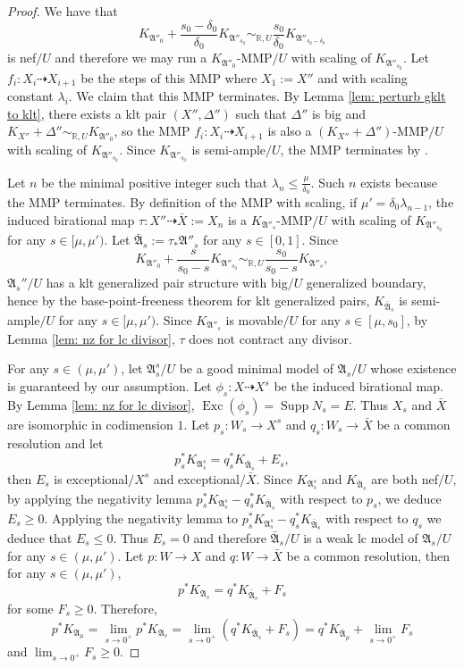 \documentclass[12pt]{amsart}
\numberwithin{equation}{section}
\newcommand{\Exc}{\operatorname{Exc}}
\newcommand{\Supp}{\operatorname{Supp}}
\newcommand{\Aa}{{\mathfrak{A}}}
\theoremstyle{definition}
\theoremstyle{definition}
\theoremstyle{definition}
\begin{document}
\begin{proof}
We have that $$K_{\Aa''_0}+\frac{s_0-\delta_0}{\delta_0}K_{\Aa''_{s_0}}\sim_{\mathbb R,U}\frac{s_0}{\delta_0}K_{\Aa''_{s_0-\delta_0}}$$
is nef$/U$ and therefore we may
run a
$K_{\Aa''_0}$-MMP$/U$ with scaling of $K_{\Aa''_{s_0}}$. 
  Let $f_i: X_i\dashrightarrow X_{i+1}$ be the steps of this MMP where $X_1:=X''$ and with scaling constant $\lambda_i$. We claim that this MMP terminates. By Lemma \ref{lem: perturb gklt to klt}, there exists a klt pair $(X'',\Delta'')$ such that $\Delta''$ is big and $K_{X''}+\Delta''\sim_{\mathbb R,U}K_{\Aa''_0}$, so the MMP $f_i: X_i\dashrightarrow X_{i+1}$ is also a $(K_{X''}+\Delta'')$-MMP$/U$ with scaling of $K_{\Aa''_{s_0}}$. Since $K_{\Aa''_{s_0}}$ is semi-ample$/U$, the MMP terminates by \cite[Corollary 1.4.2]{BCHM10}.

Let $n$ be the minimal positive integer such that $\lambda_n\leq \frac{\mu}{\delta_0}$. Such $n$ exists because the MMP terminates. By definition of the MMP with scaling, if $\mu' = \delta_0\lambda_{n-1}$, the induced birational map $\tau: X''\dashrightarrow \bar X:=X_n$ is a $K_{\Aa''_s}$-MMP$/U$ with scaling of $K_{\Aa''_{s_0}}$ for any $s\in [\mu,\mu')$. Let $\bar\Aa_s:=\tau_*\Aa''_s$ for any $s\in [0,1]$. Since
$$K_{\Aa''_0}+\frac{s}{s_0-s}K_{\Aa''_{s_0}}\sim_{\mathbb R,U}\frac{s_0}{s_0-s}K_{\Aa''_{s}},$$
$\Aa_s''/U$ has a klt generalized pair structure with big$/U$ generalized boundary, hence by the base-point-freeness theorem for klt generalized pairs, $K_{\bar{\Aa}_{s}}$ is semi-ample$/U$ for any $s\in [\mu,\mu')$. Since $K_{\Aa''_s}$ is movable$/U$ for any $s\in [\mu,s_0]$,  by Lemma \ref{lem: nz for lc divisor}, $\tau$ does not contract any divisor. 

For any $s\in (\mu,\mu')$, let $\Aa^s_s/U$ be a good minimal model of $\Aa_s/U$ whose existence is guaranteed by our assumption. Let $\phi_s: X\dashrightarrow X^s$ be the induced birational map. By Lemma \ref{lem: nz for lc divisor}, $\Exc(\phi_s)=\Supp N_s=E$. Thus $X_s$ and $\bar X$ are isomorphic in codimension $1$. Let $p_s: W_s\rightarrow X^s$ and $q_s: W_s\rightarrow\bar X$ be a common resolution and let
$$p_s^*K_{\Aa^s_s}=q_s^*K_{\bar\Aa_s}+E_s,$$
then $E_s$ is exceptional$/X^s$ and exceptional$/\bar X$. Since $K_{\Aa^s_s}$ and $K_{\bar\Aa_s}$ are both nef$/U$, by applying the negativity lemma $p_s^*K_{\Aa^s_s}-q_s^*K_{\bar\Aa_s}$ with respect to $p_s$, we deduce $E_s \ge 0$.  Applying the negativity lemma to $p_s^*K_{\Aa^s_s}-q_s^*K_{\bar\Aa_s}$ with respect to $q_s$ we deduce that $E_s \le 0$.  Thus $E_s = 0$ and therefore $\bar\Aa_s/U$ is a weak lc model of $\Aa_s/U$ for any $s\in (\mu,\mu')$. Let $p: W\rightarrow X$ and $q: W\rightarrow\bar X$ be a common resolution, then for any $s\in (\mu,\mu')$,
$$p^*K_{\Aa_s}=q^*K_{\bar\Aa_s}+F_s$$
for some $F_s\geq 0$. Therefore,
$$p^*K_{\Aa_\mu}=\lim_{s\rightarrow 0^+}p^*K_{\Aa_s}=\lim_{s\rightarrow 0^+}(q^*K_{\bar\Aa_s}+F_s)=q^*K_{\bar\Aa_{\mu}}+\lim_{s\rightarrow 0^+}F_s$$
and $\lim_{s\rightarrow 0^+}F_s\geq 0$. 


\end{proof}
\end{document}
